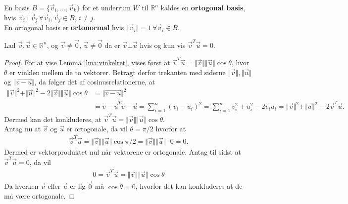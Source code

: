 \begin{defn}
En basis $B = \{\vec{v}_i,..., \vec{v}_k\}$ for  et underrum $W$ til $\mathds{R}^n$ kaldes en \textbf{ortogonal basis}, hvis 
$\vec{v}_i \bot \vec{v}_j \, \forall \vec{v}_i, \vec{v}_j \in B, \, i \neq j$.
\\En ortogonal basis er \textbf{ortonormal} hvis $\Vert\vec{v}_i\Vert = 1 \, \forall \vec{v}_i \in B$.
\end{defn}

\begin{lma}
Lad $\vec{v}, \vec{u} \in \mathds{R}^n$, og $\vec{v}\neq \vec{0}$, $\vec{u} \neq \vec{0}$ da er $\vec{v} \bot \vec{u}$ hvis og kun vis $\vec{v}^T\vec{u} = 0$.
\label{lma:vinkelret}
\end{lma}
\begin{proof}
For at vise Lemma \ref{lma:vinkelret}, vises først at $\vec{v}^T\vec{u} = \Vert\vec{v}\Vert\Vert\vec{u}\Vert\cos{\theta}$, hvor $\theta$ er vinklen mellem de to vektorer. 
Betragt derfor trekanten med siderne $\Vert\vec{v}\Vert , \Vert\vec{u}\Vert$ og $\Vert\vec{v-u}\Vert$, da følger det af cosinusrelationerne, at 
\begin{align*}
\Vert\vec{v}\Vert^2 +  \Vert\vec{u}\Vert^2 - 2\Vert\vec{v}\Vert\Vert\vec{u}\Vert\cos{\theta} &= \Vert\vec{v-u}\Vert^2 
\\ &= \vec{v-u}^T\vec{v-u} = \sum_{i=1}^n (v_i- u_i)^2 = \sum_{i=1}^n v_i^2 + u_i^2 - 2 v_iu_i = \Vert\vec{v}\Vert^2 +  \Vert\vec{u}\Vert^2 - 2\vec{v}^T\vec{u}.
\end{align*}
Dermed kan det konkluderes,  at $\vec{v}^T\vec{u} = \Vert\vec{v}\Vert\Vert\vec{u}\Vert\cos{\theta}$.
\\Antag nu at $\vec{v}$ og $\vec{u}$ er ortogonale, da vil $\theta= \pi/2$ hvorfor at 
\begin{align*}
\vec{v}^T\vec{u} = \Vert\vec{v}\Vert\Vert\vec{u}\Vert\cos{\pi/2}= \Vert\vec{v}\Vert\Vert\vec{u}\Vert\cdot0 = 0.
\end{align*}
Dermed er vektorproduktet nul når vektorene er ortogonale.
Antag til sidst at $\vec{v}^T\vec{u}=0$, da vil 
\begin{align*}
0 = \vec{v}^T\vec{u} = \Vert\vec{v}\Vert\Vert\vec{u}\Vert\cos{\theta}
\end{align*}
Da hverken $\vec{v}$ eller $\vec{u}$ er lig $\vec{0}$ må $\cos{\theta} = 0 $, hvorfor det kan konkluderes at de må være ortogonale.
\end{proof}


